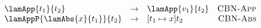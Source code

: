\begin{minipage}{2.5in}
  \begin{math}
    \begin{array}{lclr}
      \lamApp{t_1}{t_2} & \rightarrow & \lamApp{v_1}{t_2} & \text{\sc CBN-App} \\
      \lamAppP{\lamAbs{x}{t_1}}{t_2} & \rightarrow & [t_1 \mapsto x] t_2 & \text{\sc CBN-Abs}
    \end{array}
  \end{math}
\end{minipage}
